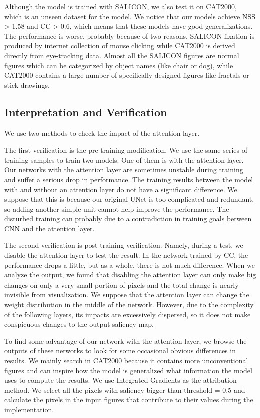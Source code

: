 \documentclass[12pt]{article}
\begin{document}
Although the model is trained with SALICON, we also test it on CAT2000, which is an unseen dataset for the model.
We notice that our models achieve NSS > 1.58 and CC > 0.6, which means that these models have good generalizations.
The performance is worse, probably because of two reasons.
SALICON fixation is produced by internet collection of mouse clicking while CAT2000 is derived directly from eye-tracking data.
Almost all the SALICON figures are normal figures which can be categorized by object names (like chair or dog), while CAT2000 contains a large number of specifically designed figures like fractals or stick drawings.


\subsection{Interpretation and Verification}

We use two methods to check the impact of the attention layer.

The first verification is the pre-training modification. We use the same series of training samples to train two models. One of them is with the attention layer. Our networks with the attention layer are sometimes unstable during training and suffer a serious drop in performance.
The training results between the model with and without an attention layer do not have a significant difference.
We suppose that this is because our original UNet is too complicated and redundant, so adding another simple unit cannot help improve the performance. The disturbed training can probably due to a contradiction in training goals between CNN and the attention layer.

The second verification is post-training verification. Namely, during a test, we disable the attention layer to test the result. In the network trained by CC, the performance drops a little, but as a whole, there is not much difference.
When we analyze the output, we found that disabling the attention layer can only make big changes on only a very small portion of pixels and the total change is nearly invisible from visualization.
We suppose that the attention layer can change the weight distribution in the middle of the network. However, due to the complexity of the following layers, its impacts are excessively dispersed, so it does not make conspicuous changes to the output saliency map.

To find some advantage of our network with the attention layer, we browse the outputs of these networks to look for some occasional obvious differences in results.
We mainly search in CAT2000 because it contains more unconventional figures and can inspire how the model is generalized what information the model uses to compute the results.
We use Integrated Gradients \cite{sundararajan2017axiomatic} as the attribution method. We select all the pixels with saliency bigger than threshold = 0.5 and calculate the pixels in the input figures that contribute to their values during the implementation.
\end{document}
